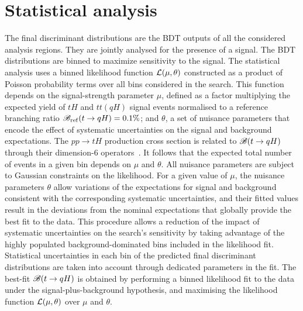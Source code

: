 \section{Statistical analysis}
\label{sec:stat_analysis}


The final discriminant distributions are the BDT outputs of all the considered analysis regions. They are jointly analysed for the 
presence of a signal. The BDT distributions are binned to maximize sensitivity to the signal.
The statistical analysis uses a binned likelihood function ${\cal L}(\mu,\theta)$ constructed as
a product of Poisson probability terms over all bins considered in the search. This function depends
on the signal-strength parameter $\mu$, defined as a factor multiplying the expected yield of $tH$ and $tt(qH)$ signal events
normalised to a reference branching ratio $\mathscr{B}_{\mathrm{ref}}(t\to qH)=0.1\%$;
and $\theta$, a set of nuisance parameters that encode the effect of systematic uncertainties on the signal and background expectations.
The $pp\rightarrow tH$ production cross section is related to $\mathscr{B}(t\rightarrow qH)$ through their dimension-6 operators~\cite{fcnc_production_theory}.
It follows that the expected total number of events in a given bin depends on $\mu$ and $\theta$. 
All nuisance parameters are subject to Gaussian constraints on the likelihood.
For a given value of $\mu$, the nuisance parameters $\theta$ allow variations of the expectations for signal and background
consistent with the corresponding systematic uncertainties, and their fitted values result in the deviations from
the nominal expectations that globally provide the best fit to the data.
This procedure allows a reduction of the impact of systematic uncertainties on 
the search's sensitivity by taking advantage of the highly populated background-dominated bins included in the likelihood fit.
Statistical uncertainties in each bin of the predicted final discriminant distributions are taken into account through dedicated parameters in the fit.     
The best-fit $\mathscr{B}(t\to qH)$ is obtained by performing a binned likelihood fit to the data under the signal-plus-background
hypothesis, and maximising the likelihood function ${\cal L}(\mu,\theta)$ over $\mu$ and $\theta$.

